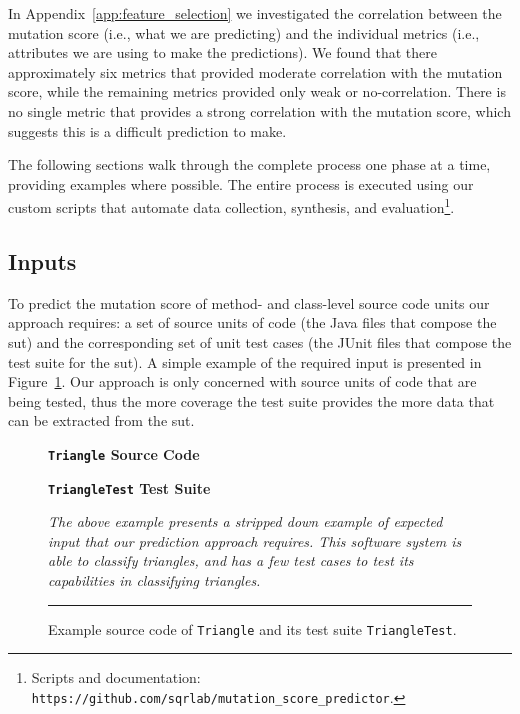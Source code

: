 In Appendix~\ref{app:feature_selection} we investigated the correlation between the mutation score (i.e., what we are predicting) and the individual metrics (i.e., attributes we are using to make the predictions). We found that there approximately six metrics that provided moderate correlation with the mutation score, while the remaining metrics provided only weak or no-correlation. There is no single metric that provides a strong correlation with the mutation score, which suggests this is a difficult prediction to make.

The following sections walk through the complete process one phase at a time, providing examples where possible. The entire process is executed using our custom scripts that automate data collection, synthesis, and evaluation\footnote{Scripts and documentation: \texttt{https://github.com/sqrlab/mutation\_score\_predictor}.}.


\subsection{Inputs}
\label{subsec:approach_inputs}
To predict the mutation score of method- and class-level source code units our approach requires: a set of source units of code (the Java files that compose the \gls{sut}) and the corresponding set of unit test cases (the JUnit files that compose the test suite for the \gls{sut}). A simple example of the required input is presented in Figure~\ref{fig:triangle_example}. Our approach is only concerned with source units of code that are being tested, thus the more coverage the test suite provides the more data that can be extracted from the \gls{sut}.

\begin{figure}[!tb]
  \centering
  \begin{minipage}[t]{7.25cm}
  \centering
  \footnotesize{\textbf{\texttt{Triangle} Source Code}}
  
  \end{minipage}
  \hfill
  \begin{minipage}[t]{7.25cm}
  \centering
  \footnotesize{\textbf{\texttt{TriangleTest} Test Suite}}
  
  \end{minipage}
  \caption{Example source code of \texttt{Triangle} and its test suite \texttt{TriangleTest}.}
  \vspace{1mm}
  \footnotesize{\emph{The above example presents a stripped down example of expected input that our prediction approach requires. This software system is able to classify triangles, and has a few test cases to test its capabilities in classifying triangles.}}
  \vspace{2mm}
  \hrule
  \label{fig:triangle_example}
\end{figure}


